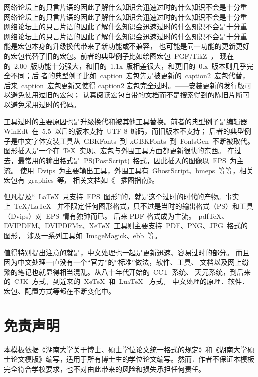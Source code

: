 网络论坛上的只言片语的因此了解什么知识会迅速过时的什么知识不会是十分重
网络论坛上的只言片语的因此了解什么知识会迅速过时的什么知识不会是十分重
网络论坛上的只言片语的因此了解什么知识会迅速过时的什么知识不会是十分重
网络论坛上的只言片语的因此了解什么知识会迅速过时的什么知识不会是十分重
能是宏包本身的升级换代带来了新功能或不兼容，
也可能是同一功能的更新更好的宏包代替了旧的宏包。前者的典型例子比如绘图宏包~PGF/TikZ~，
现在的~2.00~版功能十分强大，和旧的~1.1x~版相差很大，和更旧的~0.x~版本则几乎完全不同；后
者的典型例子比如~caption~宏包先是被更新的~caption2~宏包代替，后来~caption~宏包更新又使得
caption2 宏包完全过时。——安装更新的发行版可以避免使用过旧的宏包；
认真阅读宏包自带的文档而不是搜索得到的陈旧片断可以避免采用过时的代码。

工具过时的主要原因也是升级换代和被其他工具替换。前者的典型例子是编辑器
WinEdt~在~5.5~以后的版本支持~UTF-8~编码，而旧版本不支持；
后者的典型例子是中文字体安装工具从~GBKFonts~到~xGBKFonts~到~FontsGen~不断被取代。
图形插入是一个在~\TeX~实现、宏包与外围工具方面都更新很快的东西。
在过去，最常用的输出格式是~PS(PostScript)~格式，因此插入的图像以~EPS~为主流。
使用~Dvips~为主要输出工具，外围工具有~GhostScript、bmeps~等等，相关宏包有~graphics~等，
相关文档如《\LaTeXe{}~ 插图指南》。

但凡提及“~\LaTeX~只支持~EPS~图形”的，就是这个过时的时代的产物。事实上~\TeX/\LaTeX~
并不限定任何图形格式，只不过是当时的输出格式（PS）和工具（Dvips）对~EPS~情有独钟而已。
后来 PDF 格式成为主流。~pdf\TeX、DVIPDFM、DVIPDFMx、XeTeX~工具则主要支持~PDF、PNG、JPG~格式的图形，
涉及一系列工具如~ImageMagick、ebb~等。

值得特别提出注意的就是，中文处理也一起是更新迅速、容易过时的部分。
而且因为中文处理一直没有一个“官方”的“标准”做法，软件、工具、
文档以及网上纷繁的笔记也就显得相当混乱。从八十年代开始的~CCT~系统、
天元系统，到后来的~CJK~方式，到近来的~XeTeX~和~LuaTeX~ 方式，
中文处理的原理、软件、宏包、配置方式等都在不断变化中。


\section{免责声明}

本模板依据《湖南大学关于博士、硕士学位论文统一格式的规定》和《湖南大学硕士论文模版》编写，适用于所有博士生的学位论文编写。然而，作者不保证本模板完全符合学校要求，也不对由此带来的风险和损失承担任何责任。
